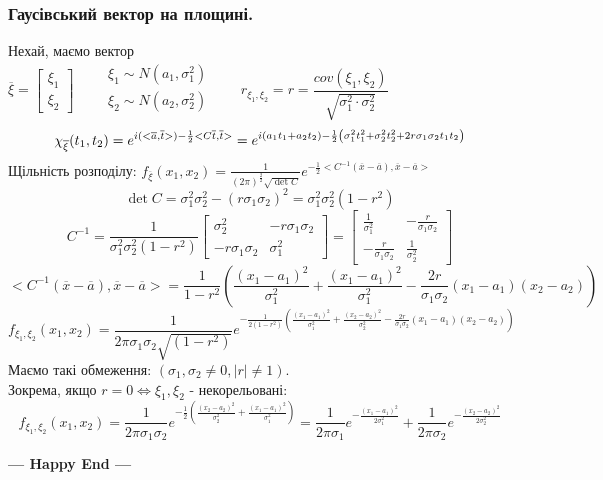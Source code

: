 \subsubsection{Гаусівський вектор на площині.}
Нехай, маємо вектор $ \overline{\xi} = \begin{bmatrix}
 \xi_1\\ \xi_2
\end{bmatrix}  \qquad  \begin{gathered}
 \xi_1 \sim	N(a_1, \sigma_1 ^2 )\\
  \xi_2 \sim	N(a_2, \sigma_2 ^2 )\\
\end{gathered} \qquad  r_{\xi_1, \xi_2} = r = \dfrac{cov(\xi_1, \xi_2)}{ \sqrt{\sigma _1 ^2 \cdot \sigma_2^2}}  $
$$
\chi_{\overline{\xi}} ( t_1, t_2) = e^{i (<\overline{a}, \overline{t}> )- \frac{1}{2} <C \overline{t}, \overline{t}> } = e^{ i (a_1t_1 + a_2 t_2 ) - \frac{1}{2}  \left( \sigma_1^2 t_1^2 + \sigma_2^2 t_2^2 + 2 r \sigma _1 \sigma _2 t_1 t_2 \right) }
$$
Щільність розподілу:
$
f_{\overline{\xi}} (x_1, x_2) = \frac{1}{ (2\pi)^{ \frac{2}{2} 	} \sqrt{\det{C}}} e^{ - \frac{1}{2} <C^{-1} (\overline{x} - \overline{a}), \overline{x} - \overline{a} >  	}
$
$$
\det{C} = \sigma _1 ^2 \sigma _2 ^2 - \left( r \sigma _1 \sigma _2 \right)^2 = \sigma _1^2 \sigma _2 ^2 (1-r^2)
$$
$$
C^{-1} = \frac{1}{\sigma _1^2 \sigma _2 ^2 (1-r^2) }  \begin{bmatrix}
  \sigma_2^2 & -r \sigma _1 \sigma _2 \\
	-r \sigma _1 \sigma _2&   \sigma_1^2
\end{bmatrix} = \begin{bmatrix}
 \frac{1}{\sigma _1^2}  & - \frac{r}{ \sigma _1 \sigma _2}\\
 - \frac{r}{ \sigma _1 \sigma _2} & \frac{1}{\sigma _2 ^2}
\end{bmatrix}
$$
$$
<C^{-1} (\overline{x} - \overline{a}) , \overline{x} - \overline{a} > = \frac{1}{ 1- r^2}
\left(  \frac{(x_1 - a_1)^2}{ \sigma _1 ^2} + \frac{(x_1 - a_1)^2}{ \sigma _1 ^2}  - \frac{2r}{\sigma _1 \sigma _2 } (x_1 - a_1 )( x_2 - a_2)  \right)
$$
$$
f_{\xi_1, \xi_2} (x_1, x_2) = \frac{1}{ 2\pi \sigma _1  \sigma _2 \sqrt{ (1-r^2)}} e^{- \frac{1}{2 ( 1- r^2)}  \left(  \frac{(x_1 - a_1)^2}{ \sigma _1 ^2} + \frac{(x_2 - a_2)^2}{ \sigma _2 ^2}  - \frac{2r}{\sigma _1 \sigma _2 } (x_1 - a_1 )( x_2 - a_2)  \right)  }
$$
Маємо такі обмеження: $( \sigma_1,\sigma_2  \neq 0, \left| r \right| \neq  1 )$.\\
Зокрема, якщо $r = 0  \Leftrightarrow \xi_1, \xi_2$ - некорельовані:
$$
f_{\xi_1, \xi_2} (x_1, x_2) =
\frac{1}{ 2\pi \sigma _1  \sigma _2}
e^{- \frac{1}{2}  \left(  \frac{(x_2 - a_2)^2}{ \sigma _2 ^2} + \frac{(x_1 - a_1)^2}{ \sigma _1 ^2} \right)  } =\frac{1}{ 2\pi \sigma _1}
e^{- \frac{(x_1 - a_1)^2} {2\sigma _1 ^2} }+ \frac{1}{ 2\pi \sigma _2}
e^{- \frac{(x_2 - a_2)^2}{2 \sigma _2 ^2} }
$$

\begin{center}
\textbf{	--- Happy End --- }
\end{center}
